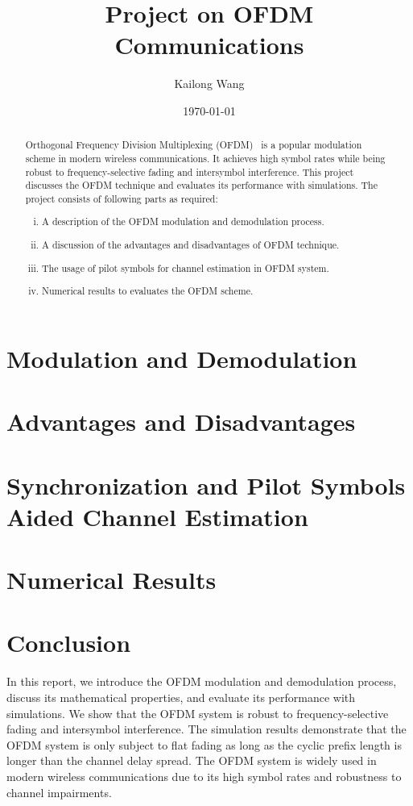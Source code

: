 \documentclass{article}
\title{Project on OFDM Communications}
\author{Kailong Wang}
\date{\today}
\begin{document}
\maketitle

\begin{abstract}
    Orthogonal Frequency Division Multiplexing (OFDM)~\cite{5307460} is a popular modulation scheme in modern wireless communications. It achieves high symbol rates while being robust to frequency-selective fading and intersymbol interference. This project discusses the OFDM technique and evaluates its performance with simulations. The project consists of following parts as required:
    \begin{enumerate}[(i)]
        \item A description of the OFDM modulation and demodulation process.
        \item A discussion of the advantages and disadvantages of OFDM technique.
        \item The usage of pilot symbols for channel estimation in OFDM system.
        \item Numerical results to evaluates the OFDM scheme.
    \end{enumerate}
\end{abstract}

\section{Modulation and Demodulation}
\label{sec:modulation}


\section{Advantages and Disadvantages}


\section{Synchronization and Pilot Symbols Aided Channel Estimation}


\section{Numerical Results}


\section{Conclusion}
In this report, we introduce the OFDM modulation and demodulation process, discuss its mathematical properties, and evaluate its performance with simulations. We show that the OFDM system is robust to frequency-selective fading and intersymbol interference. The simulation results demonstrate that the OFDM system is only subject to flat fading as long as the cyclic prefix length is longer than the channel delay spread. The OFDM system is widely used in modern wireless communications due to its high symbol rates and robustness to channel impairments.

\clearpage
\printbibliography
\end{document}
